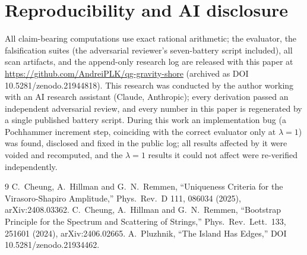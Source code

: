 \documentclass[11pt]{article}
\begin{document}
\section*{Reproducibility and AI disclosure}
All claim-bearing computations use exact rational arithmetic; the evaluator,
the falsification suites (the adversarial reviewer's seven-battery script
included), all scan artifacts, and the append-only research log are released
with this paper at \url{https://github.com/AndreiPLK/qg-gravity-shore}
(archived as DOI 10.5281/zenodo.21944818). This research was conducted by the author working with an AI
research assistant (Claude, Anthropic); every derivation passed an
independent adversarial review, and every number in this paper is
regenerated by a single published battery script. During this work an
implementation bug (a Pochhammer increment step, coinciding with the correct
evaluator only at $\lambda=1$) was found, disclosed and fixed in the public
log; all results affected by it were voided and recomputed, and the
$\lambda=1$ results it could not affect were re-verified independently.

\begin{thebibliography}{9}
 C.~Cheung, A.~Hillman and G.~N.~Remmen,
``Uniqueness Criteria for the Virasoro-Shapiro Amplitude,''
Phys.\ Rev.\ D 111, 086034 (2025), arXiv:2408.03362.
 C.~Cheung, A.~Hillman and G.~N.~Remmen,
``Bootstrap Principle for the Spectrum and Scattering of Strings,''
Phys.\ Rev.\ Lett.\ 133, 251601 (2024), arXiv:2406.02665.
 A.~Pluzhnik, ``The Island Has Edges,'' DOI 10.5281/zenodo.21934462.
\end{thebibliography}
\end{document}
